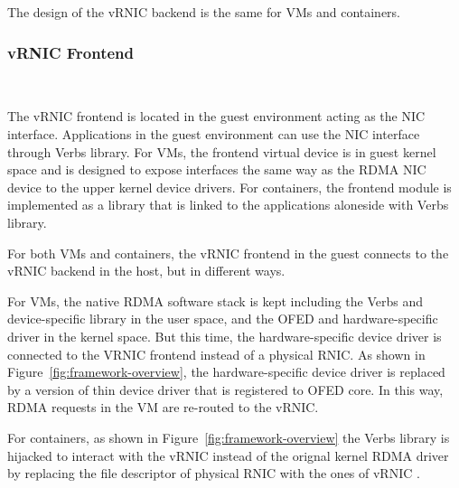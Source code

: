 The design of the vRNIC backend is the same for VMs and containers.

\subsubsection{\textbf{vRNIC Frontend}}

\
\noindent

The vRNIC frontend is located in the guest environment acting as the NIC interface. Applications in the guest environment can use the NIC interface through Verbs library. For VMs, the frontend virtual device is in guest kernel space and is designed to expose interfaces the same way as the RDMA NIC device to the upper kernel device drivers. For containers, the frontend module is implemented as a library that is linked to the applications aloneside with Verbs library.


For both VMs and containers, the vRNIC frontend in the guest connects to the vRNIC backend in the host, but in different ways.

For VMs, the native RDMA software stack is kept including the Verbs and device-specific library in the user space, and the OFED and hardware-specific driver in the kernel space. But this time, the hardware-specific device driver is connected to the VRNIC frontend instead of a physical RNIC. As shown in Figure~\ref{fig:framework-overview}, the hardware-specific device driver is replaced by a \sys version of thin device driver that is registered to OFED core. In this way, RDMA requests in the VM are re-routed to the vRNIC.

For containers, as shown in Figure~\ref{fig:framework-overview} the Verbs library is hijacked to interact with the vRNIC instead of the orignal kernel RDMA driver by replacing the file descriptor of physical RNIC with the ones of vRNIC \cite{kim2019freeflow}.

